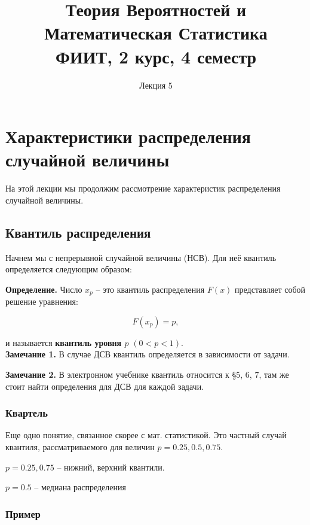 \documentclass{article}
\title{Теория Вероятностей и Математическая Статистика\\
ФИИТ, 2 курс, 4 семестр}
\author{Лекция 5}
\begin{document}
\maketitle


\section{Характеристики распределения случайной величины}

На этой лекции мы продолжим рассмотрение характеристик распределения случайной величины.

\subsection{Квантиль распределения}

Начнем мы с непрерывной случайной величины (НСВ). Для неё квантиль определяется следующим образом:

\textbf{Определение.} Число $x_p$ -- это квантиль распределения $F(x)$ представляет собой решение уравнения:

$$F(x_p) = p,$$

и называется \textbf{квантиль уровня $p$} $(0 < p < 1)$.
\\

\textbf{Замечание 1.} В случае ДСВ квантиль определяется в зависимости от задачи.

\textbf{Замечание 2.} В электронном учебнике квантиль относится к \S5, 6, 7, там же стоит найти определения для ДСВ для каждой задачи.

\subsubsection{Квартель}

Еще одно понятие, связанное скорее с мат. статистикой. Это частный случай квантиля, рассматриваемого для величин $p = 0.25, 0.5, 0.75$.

$p = 0.25, 0.75$ -- нижний, верхний квантили.

$p = 0.5$ -- медиана распределения

\subsubsection{Пример}
\end{document}
